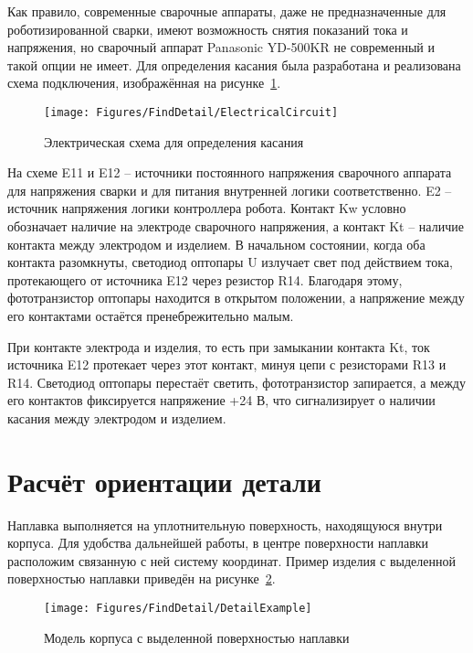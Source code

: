 Как правило, современные сварочные аппараты, даже не предназначенные для роботизированной сварки, имеют возможность снятия показаний тока и напряжения, но сварочный аппарат Panasonic YD-500KR не современный и такой опции не имеет.
Для определения касания была разработана и реализована схема подключения, изображённая на рисунке~\ref{fig:Find Touch:Electrical Circuit}.

\begin{figure}[H]
    \centering
    \vspace{14pt}
    \texttt{[image: Figures/FindDetail/ElectricalCircuit]}
    \caption{Электрическая схема для определения касания}
    \label{fig:Find Touch:Electrical Circuit}
\end{figure}

На схеме E11 и E12 -- источники постоянного напряжения сварочного аппарата для напряжения сварки и для питания внутренней логики соответственно.
E2 -- источник напряжения логики контроллера робота.
Контакт Kw условно обозначает наличие на электроде сварочного напряжения, а контакт Kt -- наличие контакта между электродом и изделием.
В начальном состоянии, когда оба контакта разомкнуты, светодиод оптопары U излучает свет под действием тока, протекающего от источника E12 через резистор R14.
Благодаря этому, фототранзистор оптопары находится в открытом положении, а напряжение между его контактами остаётся пренебрежительно малым.

При контакте электрода и изделия, то есть при замыкании контакта Kt, ток источника E12 протекает через этот контакт, минуя цепи с резисторами R13 и R14.
Светодиод оптопары перестаёт светить, фототранзистор запирается, а между его контактов фиксируется напряжение +24 В, что сигнализирует о наличии касания между электродом и изделием.


\section{Расчёт ориентации детали}
Наплавка выполняется на уплотнительную поверхность, находящуюся внутри корпуса.
Для удобства дальнейшей работы, в центре поверхности наплавки расположим связанную с ней систему координат.
Пример изделия с выделенной поверхностью наплавки приведён на рисунке~\ref{fig:Find Touch:Valve Example}.

\begin{figure}[H]
    \centering
    \vspace{14pt}
    \texttt{[image: Figures/FindDetail/DetailExample]}
    \caption{Модель корпуса с выделенной поверхностью наплавки}
    \label{fig:Find Touch:Valve Example}
\end{figure}

